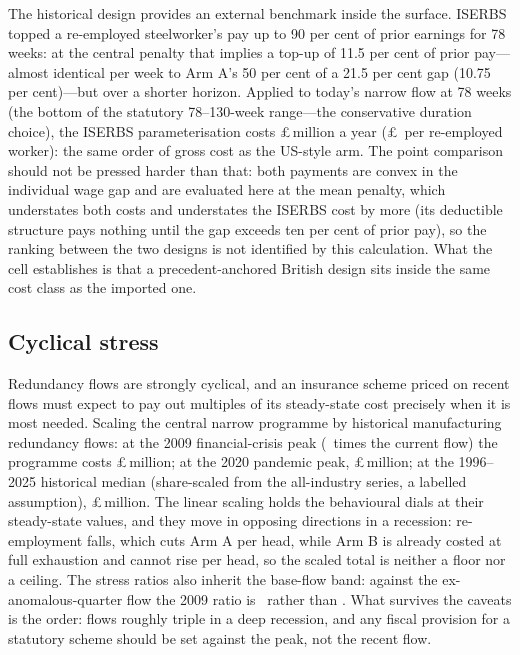 The historical design provides an external benchmark inside the surface.
ISERBS topped a re-employed steelworker's pay up to 90 per cent of prior
earnings for 78 weeks: at the central penalty that implies a top-up of
11.5 per cent of prior pay---almost identical per week to Arm A's 50 per
cent of a 21.5 per cent gap (10.75 per cent)---but over a shorter
horizon. Applied to today's narrow flow at 78 weeks (the bottom of the statutory
78--130-week range---the conservative duration choice), the ISERBS
parameterisation costs \pounds\TaaIserbsCost\,million a year
(\pounds\TaaIserbsPerWorker\ per re-employed worker): the same order of
gross cost as the US-style arm. The point comparison should not be
pressed harder than that: both payments are convex in the individual wage
gap and are evaluated here at the mean penalty, which understates both
costs and understates the ISERBS cost by more (its deductible structure
pays nothing until the gap exceeds ten per cent of prior pay), so the
ranking between the two designs is not identified by this calculation.
What the cell establishes is that a precedent-anchored British design
sits inside the same cost class as the imported one.

\subsection{Cyclical stress}\label{sec:results-cyclical}

Redundancy flows are strongly cyclical, and an insurance scheme priced on
recent flows must expect to pay out multiples of its steady-state cost
precisely when it is most needed. Scaling the central narrow programme by
historical manufacturing redundancy flows: at the 2009 financial-crisis
peak (\TaaFlowRatioGFC\ times the current flow) the programme costs \pounds\TaaCostPeakGFC\,million; at the
2020 pandemic peak, \pounds\TaaCostPeakCovid\,million; at the 1996--2025
historical median (share-scaled from the all-industry series, a labelled
assumption), \pounds\TaaCostHistMedian\,million. The linear scaling holds the behavioural
dials at their steady-state values, and they move in opposing directions
in a recession: re-employment falls, which cuts Arm A per head, while
Arm B is already costed at full exhaustion and cannot rise per head, so
the scaled total is neither a floor nor a ceiling. The stress ratios also
inherit the base-flow band: against the ex-anomalous-quarter flow the
2009 ratio is \TaaFlowRatioGFCExAnom\ rather than \TaaFlowRatioGFC.
What survives the caveats is the order: flows roughly triple in a deep
recession, and any fiscal provision for a statutory scheme should be set
against the peak, not the recent flow.

